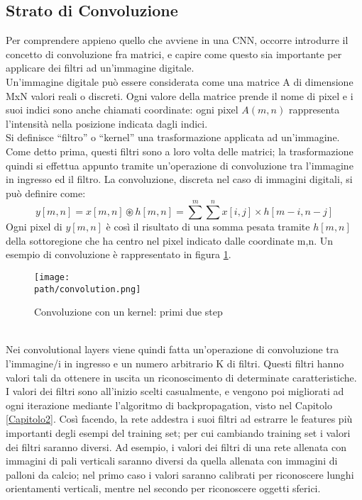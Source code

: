 \subsection{Strato di Convoluzione}
Per comprendere appieno quello che avviene in una CNN, occorre introdurre il concetto di convoluzione fra matrici, e capire come questo sia importante per applicare dei filtri ad un'immagine digitale.
\\
Un’immagine digitale può essere considerata come una matrice A di dimensione MxN valori reali o discreti. Ogni valore della matrice prende il nome di pixel e i suoi indici sono anche chiamati coordinate: ogni pixel $A(m,n)$ rappresenta l’intensità nella posizione indicata dagli indici. \\ 
Si definisce “filtro” o “kernel” una trasformazione applicata ad un’immagine. Come detto prima, questi filtri sono a loro volta delle matrici; la trasformazione quindi si effettua appunto tramite un'operazione di convoluzione tra l'immagine in ingresso ed il filtro.
La convoluzione, discreta nel caso di immagini digitali, si può definire come: 
$$
y[m,n] = x[m,n] \circledast h[m,n] = \sum^{m}\sum^{n}x[i,j]\times h[m-i,n-j]
$$
Ogni pixel di $y[m,n]$ è così il risultato di una somma pesata tramite $h[m,n]$ della sottoregione che ha centro nel pixel indicato dalle coordinate m,n. Un esempio di convoluzione è rappresentato in figura \ref{fig:convolution}. 
\begin{figure}[h!]
 \centering
 \texttt{[image: \\path/convolution.png]} 
 \caption{Convoluzione con un kernel: primi due step}
 \label{fig:convolution}
\end{figure}
\\
Nei convolutional layers viene quindi fatta un'operazione di convoluzione tra l'immagine/i in ingresso
e un numero arbitrario K di filtri. Questi filtri hanno valori tali da ottenere in uscita un riconoscimento di determinate caratteristiche. \\
I valori dei filtri sono all'inizio scelti casualmente, e vengono poi migliorati ad ogni iterazione mediante l'algoritmo di backpropagation, visto nel Capitolo \ref{Capitolo2}. Così facendo, la rete addestra i suoi filtri ad estrarre le features più importanti degli esempi del training set; per cui cambiando training set i valori dei
filtri saranno diversi.
Ad esempio, i valori dei filtri di una rete allenata con immagini di pali verticali saranno diversi da quella allenata con immagini di palloni da calcio; nel primo caso i valori saranno calibrati per riconoscere lunghi orientamenti verticali, mentre
nel secondo per riconoscere oggetti sferici. 

